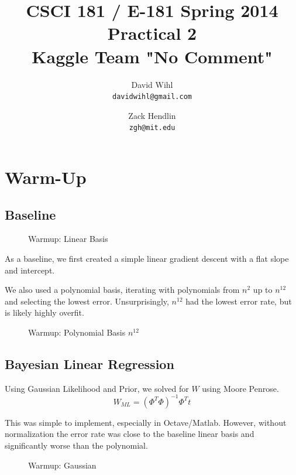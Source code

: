 \documentclass[11pt, oneside]{article}   	%
\title{CSCI 181 / E-181 Spring 2014 Practical 2 \\ 
{\large Kaggle Team "No Comment"}
}
\author{
  David Wihl\\
  \texttt{davidwihl@gmail.com}
  \and
  Zack Hendlin\\
  \texttt{zgh@mit.edu} 
}
\begin{document}
\maketitle
\section*{Warm-Up}



\subsection*{Baseline}

\begin{figure}[h!] 
  \centering
  \scalebox{0.5}{{\large }}
  \caption{Warmup: Linear Basis}
\end{figure}

As a baseline, we first created a simple linear gradient descent with a flat slope and intercept. 

We also used a polynomial basis, iterating with polynomials from $n^2$ up to $n^{12}$ and selecting the lowest error. Unsurprisingly, $n^{12}$ had the lowest error rate, but is likely highly overfit.

\begin{figure}[h!] 
  \centering
  \scalebox{0.5}{{\large }}
  \caption{Warmup: Polynomial Basis $n^{12}$}
\end{figure}

\subsection*{Bayesian Linear Regression}

Using Gaussian Likelihood and Prior, we solved for $W$ using Moore Penrose.
\begin{equation}
W_{ML} = (\Phi^T\Phi)^{-1}\Phi^Tt
\end{equation}

This was simple to implement, especially in Octave/Matlab. However, without normalization the error rate was close to the baseline linear basis and significantly worse than the polynomial.

\begin{figure}[h!] 
  \centering
  \scalebox{0.5}{{\large }}
  \caption{Warmup: Gaussian}
\end{figure}
\end{document}
